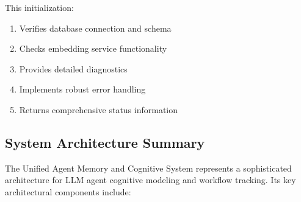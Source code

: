 \documentclass[12pt,a4paper]{article}
\begin{document}
This initialization:
\begin{enumerate}[label=\arabic*.]
    \item Verifies database connection and schema
    \item Checks embedding service functionality
    \item Provides detailed diagnostics
    \item Implements robust error handling
    \item Returns comprehensive status information
\end{enumerate}

\subsection*{System Architecture Summary}

The Unified Agent Memory and Cognitive System represents a sophisticated architecture for LLM agent cognitive modeling and workflow tracking. Its key architectural components include:
\end{document}
